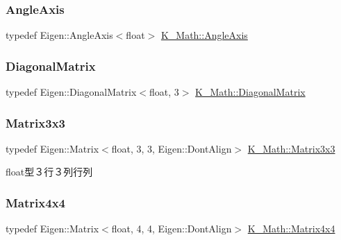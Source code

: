 \mbox{\label{namespace_k___math_a0f5db7b05f161215069d86bce9dac011}} 
\subsubsection{\texorpdfstring{Angle\+Axis}{AngleAxis}}
{\footnotesize\ttfamily typedef Eigen\+::\+Angle\+Axis$<$float$>$ \mbox{\hyperlink{namespace_k___math_a0f5db7b05f161215069d86bce9dac011}{K\+\_\+\+Math\+::\+Angle\+Axis}}}

\mbox{\label{namespace_k___math_aff8bcbdc2a06207d456cb31f4d72d861}} 
\subsubsection{\texorpdfstring{Diagonal\+Matrix}{DiagonalMatrix}}
{\footnotesize\ttfamily typedef Eigen\+::\+Diagonal\+Matrix$<$float, 3$>$ \mbox{\hyperlink{namespace_k___math_aff8bcbdc2a06207d456cb31f4d72d861}{K\+\_\+\+Math\+::\+Diagonal\+Matrix}}}

\mbox{\label{namespace_k___math_a560235ba0b8247680dfa595fc7c975dd}} 
\subsubsection{\texorpdfstring{Matrix3x3}{Matrix3x3}}
{\footnotesize\ttfamily typedef Eigen\+::\+Matrix$<$float, 3, 3, Eigen\+::\+Dont\+Align$>$ \mbox{\hyperlink{namespace_k___math_a560235ba0b8247680dfa595fc7c975dd}{K\+\_\+\+Math\+::\+Matrix3x3}}}



float型３行３列行列 

\mbox{\label{namespace_k___math_a345271af9d32dff2c964bc679b13b45c}} 
\subsubsection{\texorpdfstring{Matrix4x4}{Matrix4x4}}
{\footnotesize\ttfamily typedef Eigen\+::\+Matrix$<$float, 4, 4, Eigen\+::\+Dont\+Align$>$ \mbox{\hyperlink{namespace_k___math_a345271af9d32dff2c964bc679b13b45c}{K\+\_\+\+Math\+::\+Matrix4x4}}}



